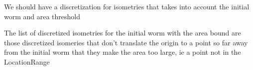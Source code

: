 
We should have a discretization for isometries that takes into account the initial worm and area threshold

\begin{definition}
  The list of discretized isometries for the initial worm with the area bound are those discretized isomeries that don't translate the origin to a point so far away from the initial worm that they make the area too large, ie a point not in the LocationRange
\end{definition}